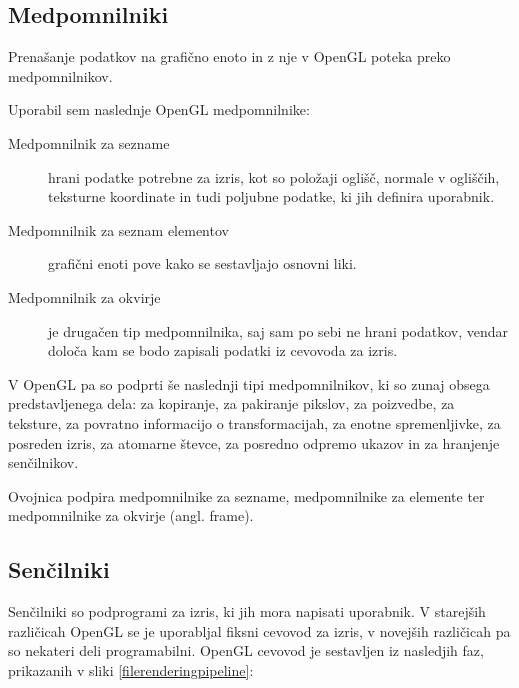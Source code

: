 \documentclass[a4paper, 12pt]{book}
\begin{document}
\subsection{Medpomnilniki}

Prenašanje podatkov na grafično enoto in z nje v OpenGL poteka preko medpomnilnikov. 

Uporabil sem naslednje OpenGL medpomnilnike:
\begin{description}

\item [Medpomnilnik za sezname] hrani podatke potrebne za izris, kot so položaji oglišč, normale v ogliščih, teksturne koordinate in tudi poljubne podatke, ki jih definira uporabnik.

\item [Medpomnilnik za seznam elementov] grafični enoti pove kako se sestavljajo osnovni liki.

\item [Medpomnilnik za okvirje] je drugačen tip medpomnilnika, saj sam po sebi ne hrani podatkov, vendar določa kam se bodo zapisali podatki iz cevovoda za izris.

\end{description}
V OpenGL pa so podprti še naslednji tipi medpomnilnikov, ki so zunaj obsega predstavljenega dela: za kopiranje, za pakiranje pikslov, za poizvedbe, za teksture, za povratno informacijo o transformacijah, za enotne spremenljivke, za posreden izris, za atomarne števce, za posredno odpremo ukazov in za hranjenje senčilnikov.


Ovojnica podpira medpomnilnike za sezname, medpomnilnike za elemente ter medpomnilnike za okvirje (angl. frame).

\subsection{Senčilniki}

Senčilniki so podprogrami za izris, ki jih mora napisati uporabnik. V starejših različicah OpenGL se je uporabljal fiksni cevovod za izris, v novejših različicah pa so nekateri deli programabilni. OpenGL cevovod je sestavljen iz nasledjih faz, prikazanih v sliki \ref{filerenderingpipeline}:
\end{document}
